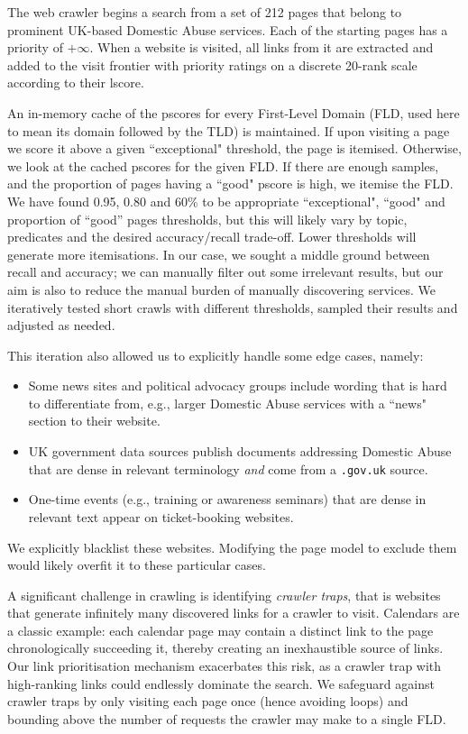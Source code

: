 \documentclass[conference]{IEEEtran}
\begin{document}
The web crawler begins a search from a set of 212 pages that belong to prominent UK-based Domestic Abuse services. Each of the starting pages has a priority of $+\infty$. When a website is visited, all links from it are extracted and added to the visit frontier with priority ratings on a discrete 20-rank scale according to their lscore.

An in-memory cache of the pscores for every First-Level Domain (FLD, used here to mean its domain followed by the TLD) is maintained. If upon visiting a page we score it above a given ``exceptional" threshold, the page is itemised. Otherwise, we look at the cached pscores for the given FLD. If there are enough samples, and the proportion of pages having a ``good" pscore is high, we itemise the FLD. We have found 0.95, 0.80 and 60\% to be appropriate ``exceptional", ``good" and proportion of ``good'' pages thresholds, but this will likely vary by topic, predicates and the desired accuracy/recall trade-off. Lower thresholds will generate more itemisations. In our case, we sought a middle ground between recall and accuracy; we can manually filter out some irrelevant results, but our aim is also to reduce the manual burden of manually discovering services. We iteratively tested short crawls with different thresholds, sampled their results and adjusted as needed.

This iteration also allowed us to explicitly handle some edge cases, namely:
\begin{itemize}
    \item Some news sites and political advocacy groups include wording that is hard to differentiate from, e.g., larger Domestic Abuse services with a ``news" section to their website.
    \item UK government data sources publish documents addressing Domestic Abuse that are dense in relevant terminology \textit{and} come from a \texttt{.gov.uk} source.
    \item One-time events (e.g., training or awareness seminars) that are dense in relevant text appear on ticket-booking websites.
\end{itemize}

We explicitly blacklist these websites. Modifying the page model to exclude them would likely overfit it to these particular cases.

A significant challenge in crawling is identifying \textit{crawler traps}, that is websites that generate infinitely many discovered links for a crawler to visit. Calendars are a classic example: each calendar page may contain a distinct link to the page chronologically succeeding it, thereby creating an inexhaustible source of links. Our link prioritisation mechanism exacerbates this risk, as a crawler trap with high-ranking links could endlessly dominate the search. We safeguard against crawler traps by only visiting each page once (hence avoiding loops) and bounding above the number of requests the crawler may make to a single FLD.
\end{document}
